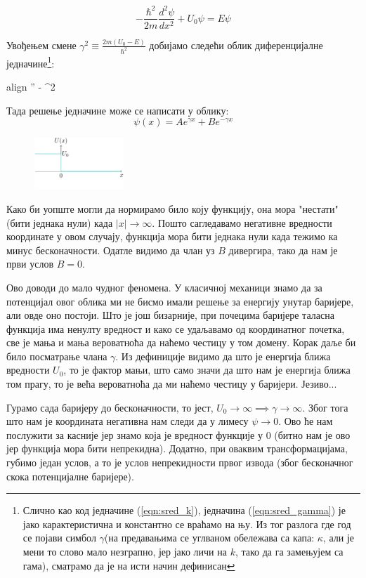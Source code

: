 \documentclass{tufte-handout} %
\newcommand{\boxedeq}[1]{\begin{empheq}[box={\fboxsep=6pt\fbox}]{align} #1\end{empheq}}
\theoremstyle{definition}
\theoremstyle{remark}
\begin{document}
\begin{equation*}
	-\frac{\hbar^2}{2m}\frac{d^2\psi}{dx^2}+U_0\psi=E\psi
\end{equation*}\par
Увођењем смене $\gamma^2\equiv\frac{2m(U_0-E)}{\hbar^2}$ добијамо следећи облик диференцијалне једначине\footnote{Слично као код једначине (\ref{eqn:sred_k}), једначина (\ref{eqn:sred_gamma}) је јако карактеристична и константно се враћамо на њу. Из тог разлога где год се појави симбол $\gamma$(на предавањима се углваном обележава са капа: $\kappa$, али је мени то слово мало незграпно, јер јако личи на $k$, тако да га замењујем са гама), сматрамо да је на исти начин дефинисан}:
\boxedeq{\label{eqn:sred_gamma}\psi'' - \gamma^2}
Тада решење једначине може се написати у облику:
\begin{equation}
	\psi(x)=Ae^{\gamma x} + Be^{-\gamma x}
\end{equation}
\begin{figure}
	\centering
	\includegraphics[width=0.3\textwidth]{konacna_barijera.png}
	\caption{}
	\label{fig:konacna_barijera}
\end{figure}\par
Како би уопште могли да нормирамо било коју функцију, она мора "нестати" (бити једнака нули) када $|x|\rightarrow\infty$. Пошто сагледавамо негативне вредности координате у овом случају, функција мора бити једнака нули када тежимо ка минус бесконачности. Одатле видимо да члан уз $B$ дивергира, тако да нам је први услов $B=0$.\par Ово доводи до мало чудног феномена. У класичној механици знамо да за потенцијал овог облика ми не бисмо имали решење за енергију унутар баријере, али овде оно постоји. Што је још бизарније, при почецима баријере таласна функција има ненулту вредност и како се удаљавамо од координатног почетка, све је мања и мања вероватноћа да наћемо честицу у том домену. Корак даље би било посматрање члана $\gamma$. Из дефиниције видимо да што је енергија ближа вредности $U_0$, то је фактор мањи, што само значи да што нам је енергија ближа том прагу, то је већа вероватноћа да ми наћемо честицу у баријери. Језиво...\par
Гурамо сада баријеру до бесконачности, то јест, $U_0\rightarrow\infty\implies\gamma\rightarrow\infty$. Због тога што нам је координата негативна нам следи да у лимесу $\psi\rightarrow0$. Ово ће нам послужити за касније јер знамо која је вредност функције у 0 (битно нам је ово јер функција мора бити непрекидна). Додатно, при оваквим трансформацијама, губимо један услов, а то је услов непрекидности првог извода (због бесконачног скока потенцијалне баријере).\par
\end{document}
